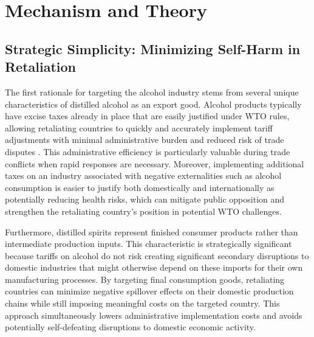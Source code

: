 \documentclass[AEJ]{AEA}
\begin{document}
	

	\section{Mechanism and Theory}
	
	\subsection{Strategic Simplicity: Minimizing Self-Harm in Retaliation}
	
	The first rationale for targeting the alcohol industry stems from several unique characteristics of distilled alcohol as an export good. Alcohol products typically have excise taxes already in place that are easily justified under WTO rules, allowing retaliating countries to quickly and accurately implement tariff adjustments with minimal administrative burden and reduced risk of trade disputes \citep{zeigler_alcohol_2009}. This administrative efficiency is particularly valuable during trade conflicts when rapid responses are necessary. Moreover, implementing additional taxes on an industry associated with negative externalities such as alcohol consumption is easier to justify both domestically and internationally as potentially reducing health risks, which can mitigate public opposition and strengthen the retaliating country's position in potential WTO challenges.
	
	Furthermore, distilled spirits represent finished consumer products rather than intermediate production inputs. This characteristic is strategically significant because tariffs on alcohol do not risk creating significant secondary disruptions to domestic industries that might otherwise depend on these imports for their own manufacturing processes. By targeting final consumption goods, retaliating countries can minimize negative spillover effects on their domestic production chains while still imposing meaningful costs on the targeted country. This approach simultaneously lowers administrative implementation costs and avoids potentially self-defeating disruptions to domestic economic activity.
	
\end{document}

